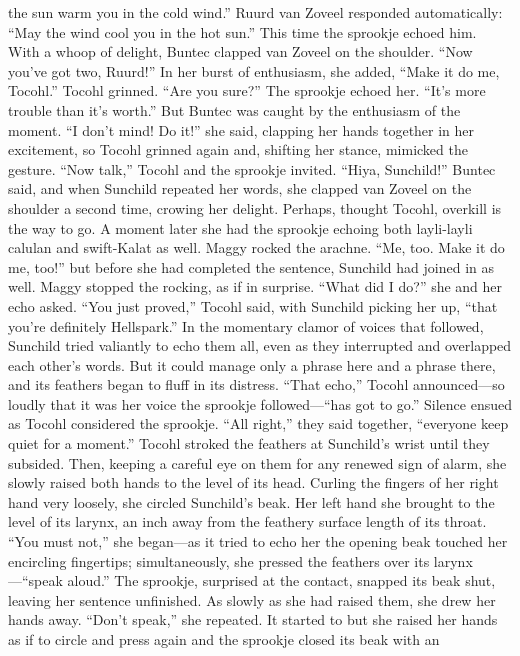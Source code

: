 \documentclass[9pt]{article}
\begin{document}
the sun warm you in the cold wind.”
Ruurd van Zoveel responded automatically: “May the wind cool you in the hot sun.” This time the
sprookje echoed him.
With a whoop of delight, Buntec clapped van Zoveel on the shoulder. “Now you’ve got two,
Ruurd!” In her burst of enthusiasm, she added, “Make it do me, Tocohl.”
Tocohl grinned. “Are you sure?” The sprookje echoed her. “It’s more trouble than it’s worth.”
But Buntec was caught by the enthusiasm of the moment. “I don’t mind! Do it!” she said, clapping
her hands together in her excitement, so Tocohl grinned again and, shifting her stance, mimicked the
gesture. “Now talk,” Tocohl and the sprookje invited.
“Hiya, Sunchild!” Buntec said, and when Sunchild repeated her words, she clapped van Zoveel on
the shoulder a second time, crowing her delight.
Perhaps, thought Tocohl, overkill is the way to go. A moment later she had the sprookje echoing
both layli-layli calulan and swift-Kalat as well.
Maggy rocked the arachne. “Me, too. Make it do me, too!” but before she had completed the
sentence, Sunchild had joined in as well. Maggy stopped the rocking, as if in surprise. “What did I do?”
she and her echo asked.
“You just proved,” Tocohl said, with Sunchild picking her up, “that you’re definitely Hellspark.”
In the momentary clamor of voices that followed, Sunchild tried valiantly to echo them all, even as
they interrupted and overlapped each other’s words. But it could manage only a phrase here and a
phrase there, and its feathers began to fluff in its distress.
“That echo,” Tocohl announced—so loudly that it was her voice the sprookje followed—“has got to
go.”
Silence ensued as Tocohl considered the sprookje. “All right,” they said together, “everyone keep
quiet for a moment.” Tocohl stroked the feathers at Sunchild’s wrist until they subsided. Then, keeping a
careful eye on them for any renewed sign of alarm, she slowly raised both hands to the level of its head.
Curling the fingers of her right hand very loosely, she circled Sunchild’s beak. Her left hand she brought
to the level of its larynx, an inch away from the feathery surface length of its throat.
“You must not,” she began—as it tried to echo her the opening beak touched her encircling
fingertips; simultaneously, she pressed the feathers over its larynx—“speak aloud.” The sprookje,
surprised at the contact, snapped its beak shut, leaving her sentence unfinished.
As slowly as she had raised them, she drew her hands away. “Don’t speak,” she repeated. It started
to but she raised her hands as if to circle and press again and the sprookje closed its beak with an
\end{document}
